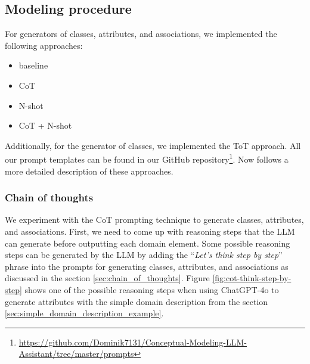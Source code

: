\subsection{Modeling procedure}

For generators of classes, attributes, and associations, we implemented the following approaches:

\begin{itemize}
\item baseline
\item CoT
\item N-shot
\item CoT + N-shot
\end{itemize}

\noindent{}Additionally, for the generator of classes, we implemented the ToT approach. All our prompt templates can be found in our GitHub repository\footnote{\url{https://github.com/Dominik7131/Conceptual-Modeling-LLM-Assistant/tree/master/prompts}}. Now follows a more detailed description of these approaches.



\subsubsection{Chain of thoughts}

We experiment with the CoT prompting technique to generate classes, attributes, and associations. First, we need to come up with reasoning steps that the LLM can generate before outputting each domain element. Some possible reasoning steps can be generated by the LLM by adding the ``\textit{Let's think step by step}'' phrase into the prompts for generating classes, attributes, and associations as discussed in the section \ref{sec:chain_of_thoughts}. Figure \ref{fig:cot-think-step-by-step} shows one of the possible reasoning steps when using ChatGPT-4o to generate attributes with the simple domain description from the section \ref{sec:simple_domain_description_example}.

